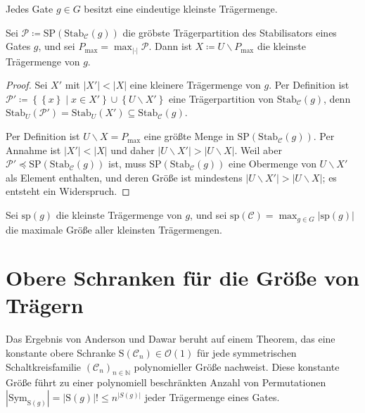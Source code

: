 \begin{cor}
Jedes Gate $g\in G$ besitzt eine eindeutige kleinste Trägermenge.
\end{cor}
\begin{prop}
Sei $\mathcal{P}\coloneqq\mathrm{SP}\left(\mathrm{Stab}_{\mathcal{C}}\left(g\right)\right)$
die gröbste Trägerpartition des Stabilisators eines Gates $g$, und
sei $P_{\max}=\max_{\left|\cdot\right|}\mathcal{P}$. Dann ist $X\coloneqq U\backslash P_{\max}$
die kleinste Trägermenge von $g$.
\end{prop}
\begin{proof}
Sei $X'$ mit $\left|X'\right|<\left|X\right|$ eine kleinere Trägermenge
von $g$. Per Definition ist $\mathcal{P}'\coloneqq\left\{ \left\{ x\right\} \mid x\in X'\right\} \cup\left\{ U\backslash X'\right\} $
eine Trägerpartition von $\mathrm{Stab}_{\mathcal{C}}\left(g\right)$,
denn $\mathrm{Stab}_{U}\left(\mathcal{P}'\right)=\mathrm{Stab}_{U}\left(X'\right)\subseteq\mathrm{Stab}_{\mathcal{C}}\left(g\right)$.

Per Definition ist $U\backslash X=P_{\max}$ eine größte Menge in
$\mathrm{SP}\left(\mathrm{Stab}_{\mathcal{C}}\left(g\right)\right)$.
Per Annahme ist $\left|X'\right|<\left|X\right|$ und daher $\left|U\backslash X'\right|>\left|U\backslash X\right|$.
Weil aber $\mathcal{P}'\preceq\mathrm{SP}\left(\mathrm{Stab}_{\mathcal{C}}\left(g\right)\right)$
ist, muss $\mathrm{SP}\left(\mathrm{Stab}_{\mathcal{C}}\left(g\right)\right)$
eine Obermenge von $U\backslash X'$ als Element enthalten, und deren
Größe ist mindestens $\left|U\backslash X'\right|>\left|U\backslash X\right|$;
es entsteht ein Widerspruch.
\end{proof}
\begin{defn}
Sei $\mathrm{sp}\left(g\right)$ die kleinste Trägermenge von $g$,
und sei $\mathrm{sp}\left(\mathcal{C}\right)=\max_{g\in G}\left|\mathrm{sp}\left(g\right)\right|$
die maximale Größe aller kleinsten Trägermengen.
\end{defn}

\section{Obere Schranken für die Größe von Trägern}

Das Ergebnis von Anderson und Dawar beruht auf einem Theorem, das
eine konstante obere Schranke $\mathrm{S}\left(\mathcal{C}_{n}\right)\in\mathcal{O}\left(1\right)$
für jede symmetrischen Schaltkreisfamilie $\left(\mathcal{C}_{n}\right)_{n\in\mathbb{N}}$
polynomieller Größe nachweist. Diese konstante Größe führt zu einer
polynomiell beschränkten Anzahl von Permutationen $\left|\mathrm{Sym}_{\mathrm{S}\left(g\right)}\right|=\left|\mathrm{S}\left(g\right)\right|!\leqslant n^{\left|S\left(g\right)\right|}$
jeder Trägermenge eines Gates.

